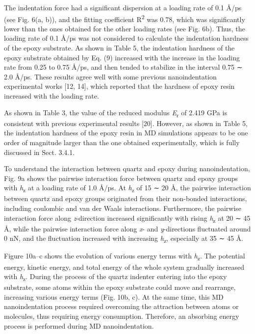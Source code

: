 \documentclass{article}
\begin{document}
The indentation force had a significant dispersion at a loading rate of 0.1 Å/ps (see Fig. 6(a, b)), and the fitting coefficient R\textsuperscript{2} was 0.78, which was significantly lower than the ones obtained for the other loading rates (see Fig. 6b). Thus, the loading rate of 0.1 Å/ps was not considered to calculate the indentation hardness of the epoxy substrate. As shown in Table 5, the indentation hardness of the epoxy substrate obtained by Eq. (9) increased with the increase in the loading rate from 0.25 to 0.75 Å/ps, and then tended to stabilize in the interval 0.75 ∼ 2.0 Å/ps. These results agree well with some previous nanoindentation experimental works [12, 14], which reported that the hardness of epoxy resin increased with the loading rate.

As shown in Table 3, the value of the reduced modulus \emph{E}\textsubscript{r} of 2.419 GPa is consistent with previous experimental results [20]. However, as shown in Table 5, the indentation hardness of the epoxy resin in MD simulations appears to be one order of magnitude larger than the one obtained experimentally, which is fully discussed in Sect. 3.4.1.

To understand the interaction between quartz and epoxy during nanoindentation, Fig. 9a shows the pairwise interaction force between quartz and epoxy groups with \emph{h}\textsubscript{z} at a loading rate of 1.0 Å/ps. At \emph{h}\textsubscript{z} of 15 ∼ 20 Å, the pairwise interaction between quartz and epoxy groups originated from their non-bonded interactions, including coulombic and van der Waals interactions. Furthermore, the pairwise interaction force along \emph{z}-direction increased significantly with rising \emph{h}\textsubscript{z} at 20 ∼ 45 Å, while the pairwise interaction force along \emph{x}- and \emph{y}-directions fluctuated around 0 nN, and the fluctuation increased with increasing \emph{h}\textsubscript{z}, especially at 35 ∼ 45 Å.

Figure 10a–c shows the evolution of various energy terms with \emph{h}\textsubscript{z}. The potential energy, kinetic energy, and total energy of the whole system gradually increased with \emph{h}\textsubscript{z}. During the process of the quartz indenter entering into the epoxy substrate, some atoms within the epoxy substrate could move and rearrange, increasing various energy terms (Fig. 10b, c). At the same time, this MD nanoindentation process required overcoming the attraction between atoms or molecules, thus requiring energy consumption. Therefore, an absorbing energy process is performed during MD nanoindentation.
\end{document}
